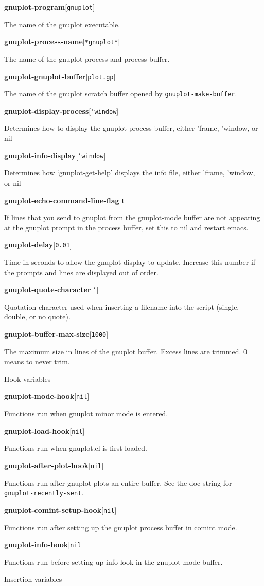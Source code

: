 \documentclass[twocolumn]{article}
\newenvironment{Boxedminipage}%
{\begin{Sbox}\begin{minipage}}%
  {\end{minipage}\end{Sbox}\Ovalbox{\TheSbox}}
\def\variable#1#2#3{{
    \vspace{-0.2truecm}
    \begin{flushright}
      \begin{minipage}[h]{0.97\linewidth}
        \vspace{-0.2truecm}
        \textbf{#1}\hfill[\texttt{#2}]
        \begin{flushright}
          \begin{minipage}[h]{0.93\linewidth}
            \vspace{-0.2truecm}
            #3
          \end{minipage}
        \end{flushright}
      \end{minipage}
    \end{flushright}
    }}
\begin{document}
\variable{gnuplot-program}{gnuplot}{The name of the gnuplot
  executable.}
%
\variable{gnuplot-process-name}{*gnuplot*}{The name of the gnuplot
  process and process buffer.}
%
\variable{gnuplot-gnuplot-buffer}{plot.gp}{The name of the gnuplot
  scratch buffer opened by \texttt{gnuplot-make-buffer}.}
%
%
\variable{gnuplot-display-process}{'window}{Determines how to display
  the gnuplot process buffer, either 'frame, 'window, or nil}
%
\variable{gnuplot-info-display}{'window}{Determines how
  `gnuplot-get-help' displays the info file, either 'frame, 'window,
  or nil}
%
\variable{gnuplot-echo-command-line-flag}{t}{If lines that you send to
  gnuplot from the gnuplot-mode buffer are not appearing at the
  gnuplot prompt in the process buffer, set this to nil and restart
  emacs.}
%
\variable{gnuplot-delay}{0.01}{Time in seconds to allow the gnuplot
  display to update.  Increase this number if the prompts and lines
  are displayed out of order.}
%
\variable{gnuplot-quote-character}{'}{Quotation character used when
  inserting a filename into the script (single, double, or no quote).}

\variable{gnuplot-buffer-max-size}{1000}{The maximum size in lines of
the gnuplot buffer.  Excess lines are trimmed.  0 means to never trim.}

\begin{center}
  \begin{Boxedminipage}{0.75\linewidth}
    \begin{center}
      {\large Hook variables}
    \end{center}
  \end{Boxedminipage}
\end{center}

\variable{gnuplot-mode-hook}{nil}{Functions run when gnuplot minor
  mode is entered.}
%
\variable{gnuplot-load-hook}{nil}{Functions run when gnuplot.el is
  first loaded.}
%
\variable{gnuplot-after-plot-hook}{nil}{Functions run after gnuplot
  plots an entire buffer.  See the doc string for
  \texttt{gnuplot-recently-sent}.}
%
\variable{gnuplot-comint-setup-hook}{nil}{Functions run after setting
  up the gnuplot process buffer in comint mode.}
%
\variable{gnuplot-info-hook}{nil}{Functions run before setting up
  info-look in the gnuplot-mode buffer.}
%



\vfill\eject


\begin{center}
  \begin{Boxedminipage}{0.75\linewidth}
    \begin{center}
      {\large Insertion variables}
    \end{center}
  \end{Boxedminipage}
\end{center}
\end{document}
